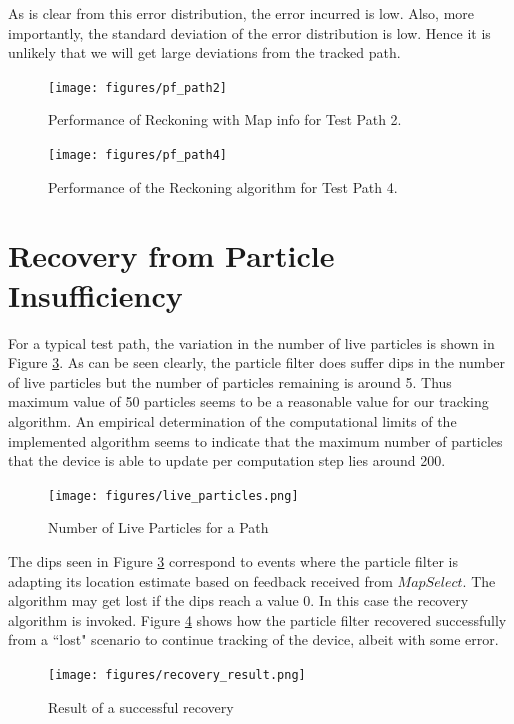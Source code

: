 As is clear from this error distribution, the error incurred is low. Also, 
more importantly, the standard deviation of the error distribution is low.
Hence it is unlikely that we will get large deviations from the tracked path.

\begin{figure}
    \centering
    \texttt{[image: figures/pf\_path2]}
    \caption{Performance of Reckoning with Map info for Test Path 2.\label{fig:pf_path2}}
\end{figure}

\begin{figure}
    \centering
    \texttt{[image: figures/pf\_path4]}
    \caption{Performance of the Reckoning algorithm for Test Path 4.\label{fig:pf_path4}}
\end{figure}


\section{Recovery from Particle Insufficiency}

For a typical test path, the variation in the number of live particles is 
shown in Figure \ref{fig:live_particles}. As can be seen clearly, the 
particle filter does suffer dips in the number of live particles but the 
number of particles remaining is around 5. Thus maximum value of 50 particles 
seems to be a reasonable value for our tracking algorithm. An empirical 
determination of the computational limits of the implemented algorithm 
seems to indicate that the maximum number of particles that the 
device is able to update per computation step lies around 200. 

\begin{figure}
    \centering
    \texttt{[image: figures/live\_particles.png]}
    \caption{Number of Live Particles for a Path\label{fig:live_particles}}
\end{figure}

The dips seen in Figure \ref{fig:live_particles} correspond to events where 
the particle filter is adapting its location estimate based on feedback 
received from $MapSelect$. The algorithm may get lost if the dips 
reach a value 0. In this case the recovery algorithm is invoked.
Figure \ref{fig:recovery_result} shows how the particle filter 
recovered successfully from a ``lost" scenario to continue tracking of the 
device, albeit with some error.

\begin{figure}
    \centering
    \texttt{[image: figures/recovery\_result.png]}
    \caption{Result of a successful recovery\label{fig:recovery_result}}
\end{figure}



